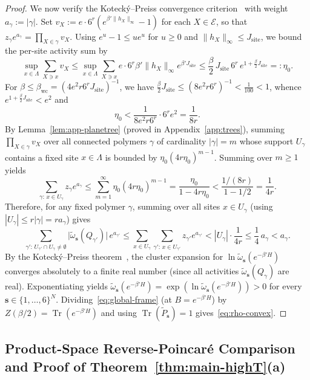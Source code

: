 \documentclass[11pt,a4paper]{article}
\numberwithin{equation}{section}
\theoremstyle{plain}
\theoremstyle{definition}
\newcommand{\Tr}{\operatorname{Tr}}
\begin{document}
\begin{proof}
We now verify the Koteck\'y--Preiss convergence criterion~\cite{Kotecky1986,Ueltschi2004} with weight $a_\gamma := |\gamma|$. Set $v_X := e\cdot 6^r(e^{\beta'\|h_X\|_\infty}-1)$ for each $X\in\mathcal{E}$, so that $z_\gamma e^{a_\gamma} = \prod_{X\in\gamma} v_X$. Using $e^u - 1 \le u e^u$ for $u\ge 0$ and $\|h_X\|_\infty \le J_{\mathrm{site}}$, we bound the per-site activity sum by
\[
  \sup_{x\in\Lambda}\sum_{X\ni x} v_X
  \le \sup_{x\in\Lambda}\sum_{X\ni x} e\cdot 6^r \beta'\|h_X\|_\infty e^{\beta' J_{\mathrm{site}}}
  \le \frac{\beta}{2}\,J_{\mathrm{site}}\,6^r\,e^{1+\frac{\beta}{2}J_{\mathrm{site}}} =: \eta_0.
\]
For $\beta\le\beta_{\mathrm{wc}} = (4e^2 r 6^r J_{\mathrm{site}})^{-1}$, we have $\frac{\beta}{2}J_{\mathrm{site}} \le (8e^2 r 6^r)^{-1} < \frac{1}{100} < 1$, whence $e^{1+\frac{\beta}{2}J_{\mathrm{site}}} < e^2$ and
\[
  \eta_0 < \frac{1}{8e^2 r 6^r}\cdot 6^r e^2 = \frac{1}{8r}.
\]
By Lemma~\ref{lem:app-planetree} (proved in Appendix~\ref{app:trees}), summing $\prod_{X\in\gamma} v_X$ over all connected polymers $\gamma$ of cardinality $|\gamma|=m$ whose support $U_\gamma$ contains a fixed site $x\in\Lambda$ is bounded by $\eta_0(4r\eta_0)^{m-1}$. Summing over $m\ge 1$ yields
\[
  \sum_{\gamma:\, x\in U_\gamma} z_\gamma e^{a_\gamma}
  \le \sum_{m=1}^\infty \eta_0(4r\eta_0)^{m-1}
  = \frac{\eta_0}{1 - 4r\eta_0}
  < \frac{1/(8r)}{1 - 1/2} = \frac{1}{4r}.
\]
Therefore, for any fixed polymer $\gamma$, summing over all sites $x\in U_\gamma$ (using $|U_\gamma|\le r|\gamma| = r a_\gamma$) gives
\[
  \sum_{\gamma':\, U_{\gamma'}\cap U_\gamma\ne\emptyset} \bigl|\widetilde{\omega}_{\mathbf{s}}(Q_{\gamma'})\bigr|\,e^{a_{\gamma'}}
  \le \sum_{x\in U_\gamma}\sum_{\gamma':\, x\in U_{\gamma'}} z_{\gamma'}e^{a_{\gamma'}}
  < |U_\gamma|\cdot\frac{1}{4r} \le \frac{1}{4}\,a_\gamma < a_\gamma.
\]
By the Koteck\'y--Preiss theorem~\cite{Kotecky1986,Ueltschi2004}, the cluster expansion for $\ln\widetilde{\omega}_{\mathbf{s}}(e^{-\beta' H})$ converges absolutely to a finite real number (since all activities $\widetilde{\omega}_{\mathbf{s}}(Q_\gamma)$ are real). Exponentiating yields $\widetilde{\omega}_{\mathbf{s}}(e^{-\beta' H}) = \exp(\ln\widetilde{\omega}_{\mathbf{s}}(e^{-\beta' H})) > 0$ for every $\mathbf{s}\in\{1,\dots,6\}^N$. Dividing~\eqref{eq:global-frame} (at $B = e^{-\beta' H}$) by $Z(\beta/2) = \Tr(e^{-\beta' H})$ and using $\Tr(\widetilde{P}_{\mathbf{s}})=1$ gives~\eqref{eq:rho-convex}.
\end{proof}

\subsection{Product-Space Reverse-Poincar\'e Comparison and Proof of Theorem~\ref{thm:main-highT}(a)}\label{subsec:highT-a}
\end{document}
